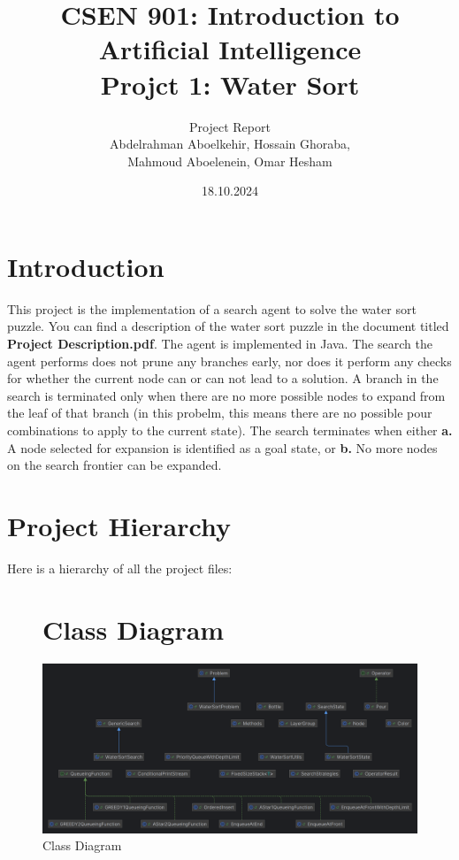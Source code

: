 \documentclass{article}
\title{CSEN 901: Introduction to Artificial Intelligence \\Projct 1: Water Sort}
\author{Project Report \vspace{24pt} \\ Abdelrahman Aboelkehir, Hossain Ghoraba, \\ Mahmoud Aboelenein, Omar Hesham}
\date{18.10.2024}
\begin{document}
\maketitle

\section{Introduction}
This project is the implementation of a search agent to solve the water sort puzzle. You can find a description of the water sort puzzle in the document titled \textbf{Project Description.pdf}. The agent is implemented in Java. The search the agent performs does not prune any branches early, nor does it perform any checks for whether the current node can or can not lead to a solution. A branch in the search is terminated only when there are no more possible nodes to expand from the leaf of that branch (in this probelm, this means there are no possible pour combinations to apply to the current state). The search terminates when either \textbf{a.} A node selected for expansion is identified as a goal state, or \textbf{b.} No more nodes on the search frontier can be expanded.

\newpage

\section{Project Hierarchy}

Here is a hierarchy of all the project files:


\newpage

\begin{figure}[t]
\section{Class Diagram}
\includegraphics[scale=0.18]{Class Diagram.png}
\caption{Class Diagram}
\end{figure}
\end{document}
